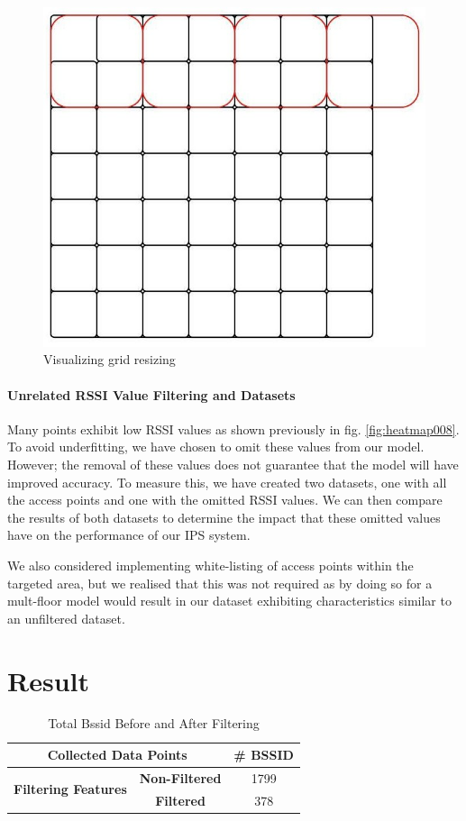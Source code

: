 \documentclass[conference]{IEEEtran}
\begin{document}
	\begin{figure}[htbp]
		\centerline{\includegraphics[scale=0.5]{image14.jpg}}
		\caption{Visualizing grid resizing}
		\label{fig:vis_grid_resize}
	\end{figure}
	
	\paragraph{Unrelated RSSI Value Filtering and Datasets} Many points exhibit low RSSI values as shown previously in fig. \ref{fig:heatmap008}. To avoid underfitting, we have chosen to omit these values from our model. However; the removal of these values does not guarantee that the model will have improved accuracy. To measure this, we have created two datasets, one with all the access points and one with the omitted RSSI values. We can then compare the results of both datasets to determine the impact that these omitted values have on the performance of our IPS system.
	
	We also considered implementing white-listing of access points within the targeted area, but we realised that this was not required as by doing so for a mult-floor model would result in our dataset exhibiting characteristics similar to an unfiltered dataset.
	
	
	\section{Result}
	\begin{table}[htbp]
		\centering
		\begin{tabular}{|c|c|c|}
			\hline
			\multicolumn{2}{|c|}{\textbf{Collected Data Points}} & \textbf{\# BSSID} \\
			\hline
			\multirow{2}{*}{\textbf{Filtering Features}} & \textbf{Non-Filtered} & 1799 \\
			\cline{2-3}
			& \textbf{Filtered}     & 378  \\
			\hline
		\end{tabular}
		\caption{Total Bssid Before and After Filtering}
		\label{tab:bssid_counts}
	\end{table}
	
\end{document}
